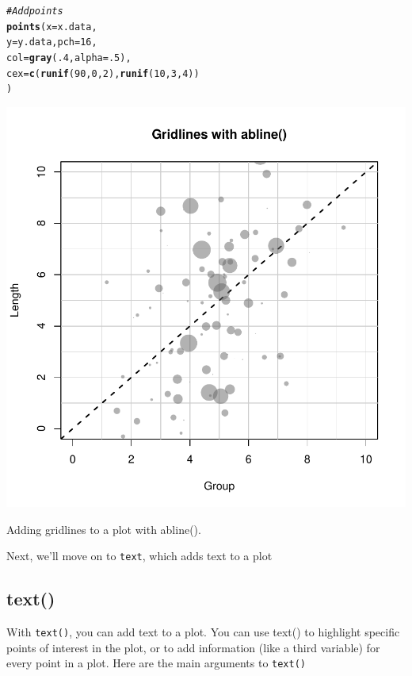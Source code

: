 \documentclass{tufte-book}\usepackage[]{graphicx}\usepackage[]{color}
\makeatletter
\def\maxwidth{ %
  \ifdim\Gin@nat@width>\linewidth
    \linewidth
  \else
    \Gin@nat@width
  \fi
}
\newcommand{\hlnum}[1]{\textcolor[rgb]{0.686,0.059,0.569}{#1}}%
\newcommand{\hlcom}[1]{\textcolor[rgb]{0.678,0.584,0.686}{\textit{#1}}}%
\newcommand{\hlstd}[1]{\textcolor[rgb]{0.345,0.345,0.345}{#1}}%
\newcommand{\hlkwc}[1]{\textcolor[rgb]{0.333,0.667,0.333}{#1}}%
\newcommand{\hlkwd}[1]{\textcolor[rgb]{0.737,0.353,0.396}{\textbf{#1}}}%
\newenvironment{kframe}{%
 \def\at@end@of@kframe{}%
 \ifinner\ifhmode%
  \def\at@end@of@kframe{\end{minipage}}%
  \begin{minipage}{\columnwidth}%
 \fi\fi%
 \def\FrameCommand##1{\hskip\@totalleftmargin \hskip-\fboxsep
 \colorbox{shadecolor}{##1}\hskip-\fboxsep
     \hskip-\linewidth \hskip-\@totalleftmargin \hskip\columnwidth}%
 \MakeFramed {\advance\hsize-\width
   \@totalleftmargin\z@ \linewidth\hsize
   \@setminipage}}%
 {\par\unskip\endMakeFramed%
 \at@end@of@kframe}
\newenvironment{knitrout}{}{} %
\makeatother
\begin{document}
\begin{footnotesize}
\begin{marginfigure}
\begin{tiny}
\begin{knitrout}
\begin{kframe}
\begin{alltt}
\hlcom{# Add points}
\hlkwd{points}\hlstd{(}\hlkwc{x} \hlstd{= x.data,}
       \hlkwc{y} \hlstd{= y.data,} \hlkwc{pch} \hlstd{=} \hlnum{16}\hlstd{,}
       \hlkwc{col} \hlstd{=} \hlkwd{gray}\hlstd{(}\hlnum{.4}\hlstd{,} \hlkwc{alpha} \hlstd{=} \hlnum{.5}\hlstd{),}
       \hlkwc{cex} \hlstd{=} \hlkwd{c}\hlstd{(}\hlkwd{runif}\hlstd{(}\hlnum{90}\hlstd{,} \hlnum{0}\hlstd{,} \hlnum{2}\hlstd{),} \hlkwd{runif}\hlstd{(}\hlnum{10}\hlstd{,} \hlnum{3}\hlstd{,} \hlnum{4}\hlstd{))}
       \hlstd{)}
\end{alltt}
\end{kframe}
\includegraphics[width=\maxwidth]{figure/unnamed-chunk-156-1} 

\end{knitrout}
\caption{Adding gridlines to a plot with abline().}
\label{fig:gridlinesexample}
\end{tiny}
\end{marginfigure}

Next, we'll move on to \texttt{text}, which adds text to a plot

\subsection{text()}

With \texttt{text()}, you can add text to a plot. You can use text() to highlight specific points of interest in the plot, or to add information (like a third variable) for every point in a plot. Here are the main arguments to \texttt{text()}





\end{footnotesize}
\end{document}
